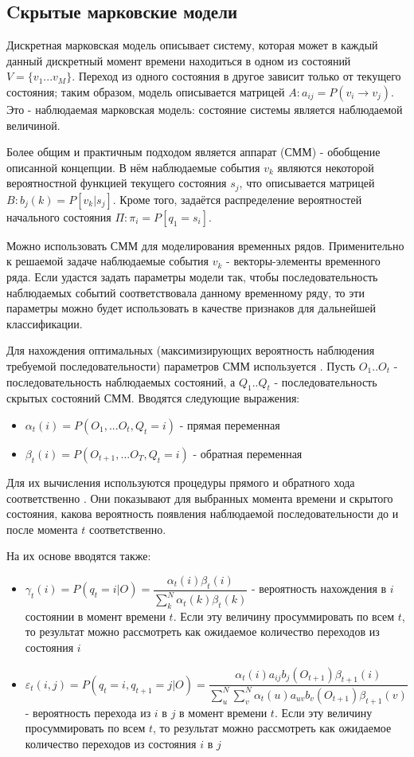 \subsection{Cкрытые марковские модели}

Дискретная марковская модель описывает систему, которая может в каждый данный дискретный момент времени находиться в одном из состояний $V=\{v_1...v_M\}$. Переход из одного состояния в другое зависит только от текущего состояния; таким образом, модель описывается матрицей $A: a_{ij}=P(v_i \to v_j)$. Это - наблюдаемая марковская модель: состояние системы является наблюдаемой величиной. 

Более общим и практичным подходом является аппарат  (СММ) - обобщение описанной концепции. В нём наблюдаемые события $v_k$ являются некоторой вероятностной функцией текущего состояния $s_j$, что описывается матрицей $B: b_j(k)=P[v_k | s_j]$. Кроме того, задаётся распределение вероятностей начального состояния $\Pi: \pi_i=P[q_1=s_i]$. 

Можно использовать СММ для моделирования временных рядов. Применительно к решаемой задаче наблюдаемые события $v_k$ - векторы-элементы временного ряда. Если удастся задать параметры модели так, чтобы последовательность наблюдаемых событий соответствовала данному временному ряду, то эти параметры можно будет использовать в качестве признаков для дальнейшей классификации.

Для нахождения оптимальных (максимизирующих вероятность наблюдения требуемой последовательности) параметров СММ используется . Пусть $O_1..O_t$ - последовательность наблюдаемых состояний, а $Q_1..Q_t$ - последовательность скрытых состояний СММ. Вводятся следующие выражения:
\begin{itemize}
\item $\alpha_t(i)=P(O_1, ... O_t , Q_t=i)$ - прямая переменная
\item $\beta_t(i)=P(O_{t+1}, ... O_T , Q_t=i)$ - обратная переменная
\end{itemize}
Для их вычисления используются процедуры прямого и обратного хода соответственно \cite{hmm_review}. Они показывают для выбранных момента времени и скрытого состояния, какова вероятность появления наблюдаемой последовательности до и после момента $t$ соответственно. 

На их основе вводятся также:
\begin{itemize}
\item $\gamma_t(i)=P(q_t=i | O)=\dfrac{\alpha_t(i)\beta_t(i)}{\sum_k^N\alpha_t(k)\beta_t(k)}$ - вероятность нахождения в $i$ состоянии в момент времени $t$. Если эту величину просуммировать по всем $t$, то результат можно рассмотреть как ожидаемое количество переходов из состояния $i$
\item $\varepsilon_t(i,j)=P(q_t=i, q_{t+1}=j | O)=\dfrac{\alpha_t(i)a_{ij}b_j(O_{t+1})\beta_{t+1}(i)}{\sum_u^N\sum_v^N\alpha_t(u)a_{uv}b_v(O_{t+1})\beta_{t+1}(v)}$ - вероятность перехода из $i$ в $j$ в момент времени $t$. Если эту величину просуммировать по всем $t$, то результат можно рассмотреть как ожидаемое количество переходов из состояния $i$ в $j$
\end{itemize}

